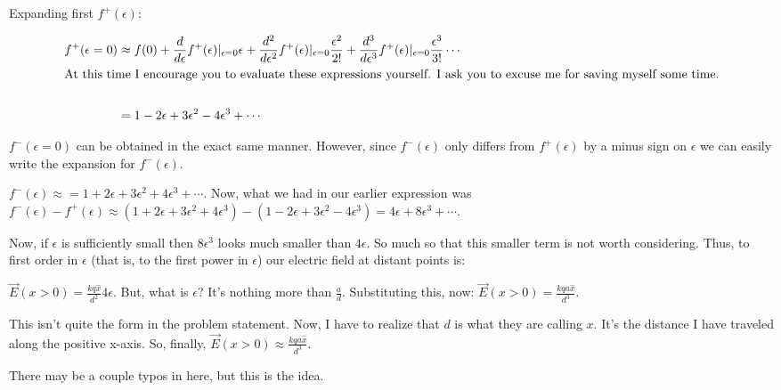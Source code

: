 \begin{homeworkProblem}[Problem 23.36]
	Expanding first $f^+(\epsilon)$:

	\begin{align}
		\label{}
		f^+(\epsilon = 0) &\approx f(0) + \frac{d}{d\epsilon}{f^+(\epsilon)}|_{\epsilon=0}\epsilon + \frac{d^2}{d\epsilon^2}{f^+(\epsilon)}|_{\epsilon=0} \frac{\epsilon^2}{2!} + \frac{d^3}{d\epsilon^3}{f^+(\epsilon)}|_{\epsilon=0} \frac{\epsilon^3}{3!} \cdots \nonumber \\
		\intertext{At this time I encourage you to evaluate these expressions yourself. I ask you to excuse me for saving myself some time.} \nonumber \\
		&= 1 - 2\epsilon + 3\epsilon^2 - 4\epsilon^3 + \cdots \nonumber \\
	\end{align}

	$f^-(\epsilon = 0)$ can be obtained in the exact same manner. However, since $f^-(\epsilon)$ only differs from $f^+(\epsilon)$ by a minus sign on $\epsilon$ we can easily write the expansion for $f^-(\epsilon)$.

	$f^-(\epsilon) \approx = 1 + 2\epsilon + 3\epsilon^2 + 4\epsilon^3 + \cdots $. Now, what we had in our earlier expression was $f^-(\epsilon) - f^+(\epsilon) \approx (1 + 2\epsilon + 3\epsilon^2 + 4\epsilon^3) - (1-2\epsilon + 3\epsilon^2 - 4\epsilon^3) = 4\epsilon +8\epsilon^3 + \cdots$. 

	Now, if $\epsilon$ is sufficiently small then $8\epsilon^3$ looks much smaller than $4\epsilon$. So much so that this smaller term is not worth considering. Thus, to first order in $\epsilon$ (that is, to the first power in $\epsilon$) our electric field at distant points is:

	$\vec{E}(x>0) = \frac{k q \hat{x}}{d^2} 4 \epsilon$. But, what is $\epsilon$? It's nothing more than $\frac{a}{d}$. Substituting this, now: $\vec{E}(x>0) = \frac{k q a\hat{x} }{d^3}$.

	This isn't quite the form in the problem statement. Now, I have to realize that $d$ is what they are calling $x$. It's the distance I have traveled along the positive x-axis. So, finally, $\vec{E}(x>0) \approx \frac{k q a \hat{x} }{d^3} $. 

	There may be a couple typos in here, but this is the idea.
	
\end{homeworkProblem}
